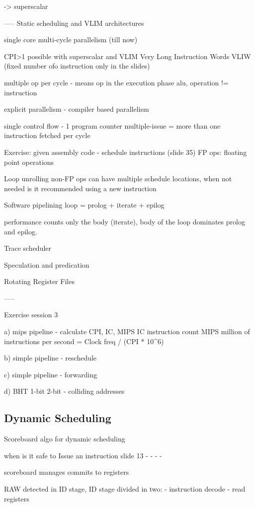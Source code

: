 -> superscalar



-----
Static scheduling and VLIM architectures

single core multi-cycle parallelism (till now)

CPI>1 possible with superscalar and VLIM
Very Long Instruction Words VLIW
(fixed number ofo instruction only in the slides)

multiple op per cycle - means op in the execution phase alu, operation != instruction

explicit parallelism - compiler based parallelism

single control flow - 1 program counter
multiple-issue = more than one instruction fetched per cycle


Exercise: given assembly code - schedule instructions (slide 35)
FP ops: floating point operations

Loop unrolling
non-FP ops can have multiple schedule locations, when not needed is it recommended using a new instruction

Software pipelining
loop = prolog + iterate + epilog

performance counts only the body (iterate), body of the loop dominates prolog and epilog.



Trace scheduler

Speculation and predication


Rotating Register Files

-----

Exercise session 3

a) mips pipeline
- calculate CPI, IC, MIPS
IC instruction count
MIPS million of instructions per second = Clock freq / (CPI * 10^6)

b) simple pipeline
- reschedule

c) simple pipeline
- forwarding

d) BHT 1-bit 2-bit
- colliding addresses


\subsection{Dynamic Scheduling}\label{subsec:dynamic-scheduling}

Scoreboard algo for dynamic scheduling

when is it safe to Issue an instruction slide 13
-
-
-
-

scoreboard manages commits to registers

RAW detected in ID stage, ID stage divided in two:
- instruction decode
- read registers

